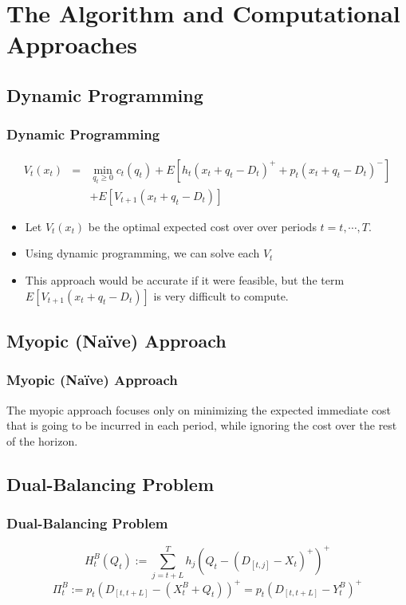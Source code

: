 \documentclass{beamer}
\begin{document}
  \section{The Algorithm and Computational Approaches}
    \subsection{Dynamic Programming}
    \begin{frame}
    \frametitle{Dynamic Programming}
      \begin{eqnarray*}
      V_{t}\left(x_{t}\right) & = & \min_{q_{t}\geq0}c_{t}\left(q_{t}\right)+E\left[h_{t}\left(x_{t}+q_{t}-D_{t}\right)^{+}+p_{t}\left(x_{t}+q_{t}-D_{t}\right)^{-}\right]\\
       &  & + E\left[V_{t+1}\left(x_{t}+q_{t}-D_{t}\right)\right]
      \end{eqnarray*}
      \begin{itemize}
        \item Let $V_{t}\left(x_{t}\right)$ be the optimal expected cost over over periods $t=t,\cdots,T.$
        \item Using dynamic programming, we can solve each $V_{t}$
        \item This approach would be accurate if it were feasible, but the term $E\left[V_{t+1}\left(x_{t}+q_{t}-D_{t}\right)\right]$ is very difficult to compute.
      \end{itemize}
    \end{frame}

    \subsection{Myopic (Na{\"i}ve) Approach}
    \begin{frame}
    \frametitle{Myopic (Na{\"i}ve) Approach}
      The myopic approach focuses only on minimizing the expected immediate cost that is going to be incurred in each period, while ignoring the cost over the rest of the horizon.
    \end{frame}

    \subsection{Dual-Balancing Problem}
    \begin{frame}
    \frametitle{Dual-Balancing Problem}
      \[H_t^B(Q_t):=\sum\limits_{j=t+L}^T h_j(Q_t-(D_{[t,j]}-X_t)^+)^+\]
      \[\Pi_t^B:=p_t(D_{[t,t+L]}-(X_t^B+Q_t))^+=p_t(D_{[t,t+L]}-Y_t^B)^+\]
    \end{frame}
\end{document}
